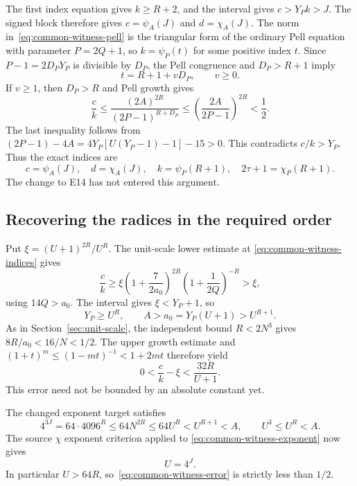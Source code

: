 The first index equation gives $k\ge R+2$, and the interval gives
$c>Y_Pk>J$. The signed block therefore gives
$c=\psi_A(J)$ and $d=\chi_A(J)$.
The norm in~\eqref{eq:common-witness-pell} is the triangular form
of the ordinary Pell equation with parameter $P=2Q+1$, so
$k=\psi_P(t)$ for some positive index $t$.
Since $P-1=2D_PY_P$ is divisible by $D_P$, the Pell congruence
and $D_P>R+1$ imply
\[
 t=R+1+vD_P,\qquad v\ge0.
\]
If $v\ge1$, then $D_P>R$ and Pell growth gives
\[
 \frac ck\le\frac{(2A)^{2R}}{(2P-1)^{R+D_P}}
 \le\left(\frac{2A}{2P-1}\right)^{2R}<\frac12.
\]
The last inequality follows from
$(2P-1)-4A=4Y_P[U(Y_P-1)-1]-15>0$.
This contradicts $c/k>Y_P$. Thus the exact indices are
\begin{equation}\label{eq:common-witness-indices}
 c=\psi_A(J),\quad d=\chi_A(J),\quad
 k=\psi_P(R+1),\quad 2\tau+1=\chi_P(R+1).
\end{equation}
The change to E14 has not entered this argument.

\subsection{Recovering the radices in the required order}

Put $\xi=(U+1)^{2R}/U^R$. The unit-scale lower estimate at
\eqref{eq:common-witness-indices} gives
\[
 \frac ck\ge
 \xi\left(1+\frac7{2a_0}\right)^{2R}
     \left(1+\frac1{2Q}\right)^{-R}>\xi,
\]
using $14Q>a_0$. The interval gives $\xi<Y_P+1$, so
\begin{equation}\label{eq:common-witness-size}
 Y_P\ge U^R,\qquad A>a_0=Y_P(U+1)>U^{R+1}.
\end{equation}
As in Section~\ref{sec:unit-scale}, the independent bound
$R<2N^3$ gives $8R/a_0<16/N<1/2$. The upper growth estimate and
$(1+t)^m\le(1-mt)^{-1}<1+2mt$ therefore yield
\begin{equation}\label{eq:common-witness-error}
 0<\frac ck-\xi<\frac{32R}{U+1}.
\end{equation}
This error need not be bounded by an absolute constant yet.

The changed exponent target satisfies
\[
 4^{3J}=64\cdot4096^R
 \le64N^{2R}\le64U^R<U^{R+1}<A,
 \qquad U^3\le U^R<A.
\]
The source $\chi$ exponent criterion applied to
\eqref{eq:common-witness-exponent} now gives
\begin{equation}\label{eq:common-witness-power}
 U=4^J.
\end{equation}
In particular $U>64R$, so~\eqref{eq:common-witness-error} is
strictly less than $1/2$.

